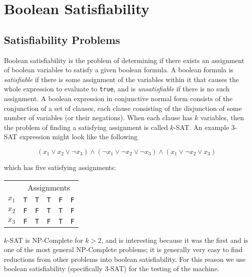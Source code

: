 \chapter{Boolean Satisfiability}
\section{Satisfiability Problems}
Boolean satisfiability is the problem of determining if there exists an assignment of boolean variables to satisfy a given boolean formula.  A boolean formula is \emph{satisfiable} if there is some assignment of the variables within it that causes the whole expression to evaluate to \texttt{true}, and is \emph{unsatisfiable} if there is no such assignment.  
A boolean expression in conjunctive normal form consists of the conjunction of a set of clauses, each clause consisting of the disjunction of some number of variables (or their negations).  When each clause has $k$ variables, then the problem of finding a satisfying assignment is called $k$-SAT.  An example 3-SAT expression might look like the following

\begin{equation}
	(x_1 \vee x_2 \vee \neg x_3) \wedge (\neg x_1 \vee \neg x_2 \vee \neg x_3) \wedge (x_1 \vee \neg x_2 \vee x_3)
\end{equation}

which has five satisfying assignments:

\begin{center}
\begin{tabular}{l || l | l | l | l | l}
	\multicolumn{1}{l}{} & \multicolumn{5}{c}{Assignments} \\
	$x_1$ & \texttt{T} & \texttt{T} & \texttt{T} & \texttt{F} & \texttt{F} \\
	$x_2$ & \texttt{F} & \texttt{F} & \texttt{T} & \texttt{T} & \texttt{F} \\
	$x_3$ & \texttt{F} & \texttt{T} & \texttt{F} & \texttt{T} & \texttt{F} \\
\end{tabular}
\end{center}

$k$-SAT is NP-Complete\cite{sat} for $k > 2$, and is interesting because it was the first and is one of the most general NP-Complete problems; it is generally very easy to find reductions from other problems into boolean satisfiability.  For this reason we use boolean satisfiability (specifically 3-SAT) for the testing of the \machine machine.

